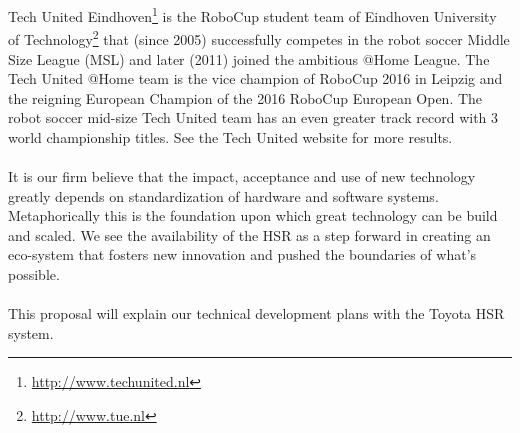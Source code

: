 Tech United Eindhoven\footnote{\url{http://www.techunited.nl}} is the RoboCup student team of Eindhoven University of Technology\footnote{\url{http://www.tue.nl}} that (since 2005) successfully competes in the robot soccer Middle Size League (MSL) and later (2011) joined the ambitious @Home League. The Tech United @Home team is the vice champion of RoboCup 2016 in Leipzig and the reigning European Champion of the 2016 RoboCup European Open. The robot soccer mid-size Tech United team has an even greater track record with 3 world championship titles. See the Tech United website for more results.
\\\\
It is our firm believe that the impact, acceptance and use of new technology greatly depends on standardization of hardware and software systems. Metaphorically this is the foundation upon which great technology can be build and scaled. We see the availability of the HSR as a step forward in creating an eco-system that fosters new innovation and pushed the boundaries of what’s possible. 
\\\\
This proposal will explain our technical development plans with the Toyota HSR system.